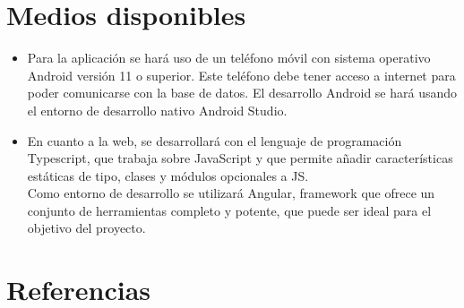 \documentclass[12pt,oneside,a4paper]{article}
\begin{document}
\section{Medios disponibles}

\begin{itemize}
    \item Para la aplicación se hará uso de un teléfono móvil con sistema operativo Android versión 11 o superior. Este teléfono debe tener acceso a internet para poder comunicarse con la base de datos.
     El desarrollo Android se hará usando el entorno de desarrollo nativo Android Studio. \\

    \item En cuanto a la web, se desarrollará con el lenguaje de programación Typescript, que trabaja sobre JavaScript y que permite añadir características estáticas de tipo, clases y módulos opcionales a JS. \\ 
    Como entorno de desarrollo se utilizará Angular, framework que ofrece un conjunto de herramientas completo y potente, que puede ser ideal para el objetivo del proyecto.
\end{itemize}






\section{Referencias}


\end{document}
